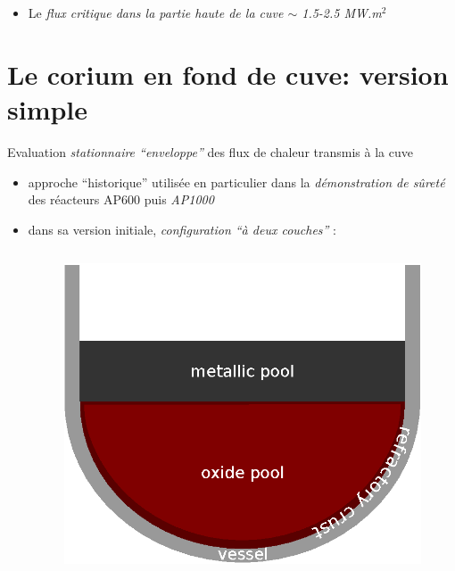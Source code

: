 \begin{frame}[fragile]
\begin{itemize}
\begin{columns}
\begin{column}{0.25\textwidth}
\begin{figure}[H]
\caption{\tiny Corrélation ULPU appliqué à un fond de cuve en calotte sphérique}
\end{figure}
\end{column}
\end{columns}
\item Le \emph{flux critique dans la partie haute de la cuve $\sim$ 1.5-2.5 MW.m$^2$}
\end{itemize}
\end{frame}

\section{Le corium en fond de cuve: version simple}
\begin{frame}[fragile]
Evaluation \emph{stationnaire ``enveloppe''} des flux de chaleur transmis à la cuve
\begin{itemize}
\item approche ``historique'' utilisée en particulier dans la \emph{démonstration de sûreté} des réacteurs AP600 puis \emph{AP1000} \cite{Esmaili2004} 
\item dans sa version initiale, \emph{configuration ``à deux couches''} :
\begin{columns}[T]
    \begin{column}{0.35\textwidth}
      \begin{figure}[H]
\centering \includegraphics[height=0.4\textheight]{Figures/TD_2layer_2.eps}

\end{figure}
\end{column}
\end{columns}
\end{itemize}
\end{frame}
